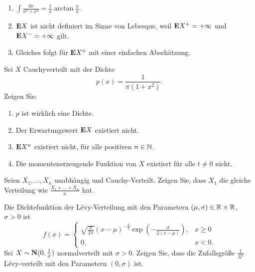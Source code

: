 \solution
\begin{enumerate}
    \item $\int \frac{dx}{a^2+x^2} = \frac{1}{a} \arctan \frac{x}{a}$.
    \item $\mathbf E X$ ist nicht definiert im Sinne von Lebesque, weil 
        $\mathbf E X^{+}=+\infty$ und $\mathbf E X^{-}=+\infty$ gilt. 
    \item Gleiches folgt für $\mathbf E X^{n}$ mit einer einfachen Abschätzung.
\end{enumerate}


Sei $X$ Cauchyverteilt mit der Dichte
\begin{equation*}
    p(x) = \frac{1}{\pi (1+x^2)}.
\end{equation*}
Zeigen Sie:
\begin{enumerate}
    \item $p$ ist wirklich eine Dichte.
    \item Der Erwartungswert $\mathbf{E} X$ existiert nicht.
    \item $\mathbf{E} X^n$ existiert nicht, für alle positiven $n\in \mathbb N$. 
    \item Die momentenerzeugende Funktion von $X$ existiert für alle $t \neq 0$ nicht. 
\end{enumerate}

 Seien $X_1,\dots ,X_n$
unabhängig und Cauchy-Verteilt. Zeigen Sie, dass $X_1$ die gleiche
Verteilung wie $\frac{X_1 +\dots + X_n}{n}$ hat. 




 Die Dichtefunktion der
L\'evy-Verteilung mit den Parametern $(\mu,\sigma)\in \mathbb R\times\mathbb R$, $\sigma>0$ ist
\begin{equation*}
    f(x) = 
    \begin{cases}
    \sqrt{ \frac{\sigma}{2\pi}} (x-\mu)^{-\frac{3}{2}} \exp\left( -\frac{\sigma}{2(x-\mu)} \right), & x\geq 0 \\
    0, & x<0.
    \end{cases}
\end{equation*}
Sei $X\sim \mathbf N (0, \frac{1}{\sigma})$ normalverteilt mit $\sigma>0$.  Zeigen
Sie, dass die Zufallsgröße $\frac{1}{X^2}$ L\'evy-verteilt mit den
Parametern $(0,\sigma)$ ist.

